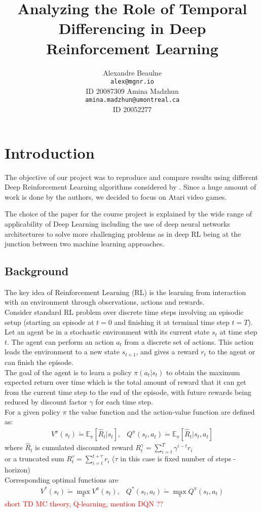 \documentclass{article}
\title{Analyzing the Role of Temporal Differencing in Deep Reinforcement Learning}
\author{
  Alexandre Beaulne \\
  \texttt{alex@mgnr.io} \\
  ID 20087309
  \And
  Amina Madzhun \\
  \texttt{amina.madzhun@umontreal.ca} \\
  ID 20052277
}
\def\defeq{\dot=}
\begin{document}
\maketitle
\section{Introduction}

The objective of our project was to reproduce and compare results
using different Deep Reinforcement Learning algorithms considered
by \citet{amiranashvili2018analyzing}. Since a huge amount of work is
done by the authors, we decided to focus on Atari
video games.

The choice of the paper for the course project is explained
by the wide range of applicability of Deep Learning
including the use of deep neural networks architectures
to solve more challenging problems as in deep RL
being at the junction between two machine learning approaches.

\subsection*{Background}
	The key idea of Reinforcement Learning (RL) is the learning
    from interaction with an environment through observations,
    actions and rewards. \\
    Consider standard RL problem over discrete time steps
    involving an episodic setup (starting an episode at $t=0$ and finishing it at
    terminal time step $t=T$).
    Let an agent be in a stochastic environment
    with its current state $s_t$ at time step $t$.
    The agent can perform
    an action $a_t$ from a discrete set of actions.
    This action leads the environment to a new state $s_{t + 1}$,
    and gives a reward $r_t$ to the agent or can finish the episode. \\
    The goal of the agent is to learn a policy $\pi(a_t|s_t)$
    to obtain the maximum expected return over time which is
    the total amount
    of reward that it can get from the current time step
    to the end of the episode,
    with future rewards being reduced by discount factor $\gamma$
    for each time step. \\
    For a given policy $\pi$ the value function and the action-value function
    are defined as:
	\begin{eqnarray*}
    	V^\pi(s_t) \defeq \mathbb{E}_{\pi} [\hat{R}_t | s_t], &
        Q^\pi(s_t, a_t) \defeq \mathbb{E}_{\pi} [\hat{R}_t | s_t, a_t]
	\end{eqnarray*}
    where $\hat{R}_t$ is cumulated discounted reward
    $R^\gamma_t = \sum_{i=t}^T \gamma^{i-t} r_i$ \\
    or a truncated sum $R^\tau_t = \sum_{i=t}^{t+\tau} r_i$
    ($\tau$ in this case is fixed number of steps - horizon)
    \\
    Corresponding optimal functions are
    \begin{eqnarray*}
    	V^*(s_t) \defeq \max_{\pi}V^\pi(s_t), &
        Q^*(s_t, a_t) \defeq \max_{\pi} Q^\pi(s_t, a_t)
	\end{eqnarray*}
    \textcolor{red}{short TD MC theory, Q-learning, mention DQN ??}
\end{document}
